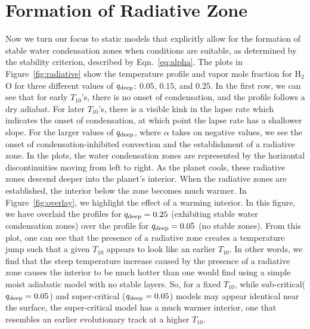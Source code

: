 \documentclass[11pt]{ucscthesisbs}
\begin{document}
\section{Formation of Radiative Zone}
Now we turn our focus to static models that explicitly allow for the formation of stable water condensation zones when conditions are suitable, as determined by the stability criterion, described by Eqn.~\ref{eq:alpha}. The plots in Figure~\ref{fig:radiative} show the temperature profile and vapor mole fraction for H$_{2}$O for three different values of $q_{\rm deep}$: $0.05$, $0.15$, and $0.25$. In the first row, we can see that for early $T_{10}$'s, there is no onset of condensation, and the profile follows a dry adiabat. For later $T_{10}$'s, there is a visible kink in the lapse rate which indicates the onset of condensation, at which point the lapse rate has a shallower slope. For the larger values of $q_{\rm deep}$, where $\alpha$ takes on negative values, we see the onset of condensation-inhibited convection and the establishment of a radiative zone. In the plots, the water condensation zones are represented by the horizontal discontinuities moving from left to right. As the planet cools, these radiative zones descend deeper into the planet's interior. When the radiative zones are established, the interior below the zone becomes much warmer. In Figure~\ref{fig:overlay}, we highlight the effect of a warming interior. In this figure, we have overlaid the profiles for $q_{\rm deep} = 0.25$ (exhibiting stable water condensation zones) over the profile for $q_{\rm deep}=0.05$ (no stable zones). From this plot, one can see that the presence of a radiative zone creates a temperature jump such that a given $T_{10}$ appears to look like an earlier $T_{10}$. In other words, we find that the steep temperature increase caused by the presence of a radiative zone causes the interior to be much hotter than one would find using a simple moist adiabatic model with no stable layers. So, for a fixed $T_{10}$, while sub-critical($q_{\rm deep} = 0.05$) and super-critical ($q_{\rm deep} = 0.05$) models may appear identical near the surface, the super-critical model has a much warmer interior, one that resembles an earlier evolutionary track at a higher $T_{10}$.
\end{document}
